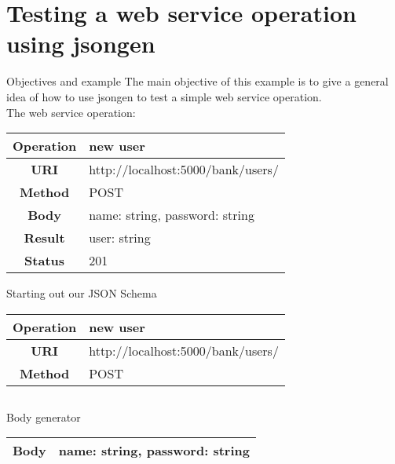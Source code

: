 \section{Testing a web service operation using jsongen}


\begin{frame}{Objectives and example}
  The main objective of this example is to give a general idea of how
  to use jsongen to test a simple web service operation.\\

  The web service operation:\\

  \centering
  \begin{tabular}{| c | l |}
    \hline
    \textbf{Operation} & new user \\ \hline
    \textbf{URI}       & http://localhost:5000/bank/users/ \\ \hline
    \textbf{Method}    & POST     \\ \hline
    \textbf{Body}      & name: string, password: string \\ \hline
    \textbf{Result}    & user: string \\ \hline
    \textbf{Status}    & 201 \\ \hline
  \end{tabular}
  \centering
\end{frame}

\begin{frame}{Starting out our JSON Schema}
  \centering
  \begin{tabular}{| c | l |}
    \hline
    \textbf{Operation} & new user \\ \hline
    \textbf{URI}       & http://localhost:5000/bank/users/ \\ \hline
    \textbf{Method}    & POST     \\ \hline
  \end{tabular}
  \centering
  \inputminted{js}{./code/example1_op_description.jsch}
\end{frame}

\begin{frame}{Body generator}
  \centering
  \begin{tabular}{| c | l |}
    \hline
    \textbf{Body} & name: string, password: string \\ \hline
  \end{tabular}

  \begin{minipage}{0.5\textwidth}
    \inputminted{js}{./code/example1_body.jsch}
  \end{minipage}
  \vline
  \pause
  \hspace{10pt}
  \begin{minipage}{0.4\textwidth}
    \centering
    \inputminted{js}{./code/example1_body-gen.jsch}
  \end{minipage}

  \centering

\end{frame}

